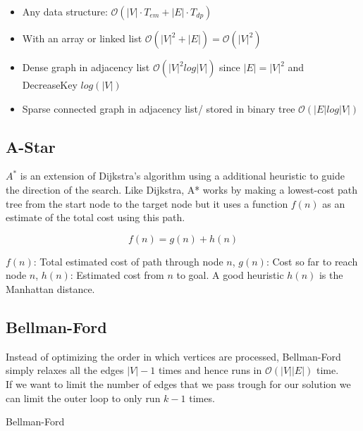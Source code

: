 \documentclass[9pt,landscape,a4paper, table]{extarticle}
\begin{document}
\begin{multicols*}{3}
\begin{itemize}
    \item Any data structure: $\mathcal{O}(|V|\cdot T_{em} + |E| \cdot T_{dp})$
    \item With an array or linked list $\mathcal{O}(|V|^2 + |E|) = \mathcal{O}(|V|^2) $
    \item Dense graph in adjacency list $\mathcal{O}(|V|^2 log |V|) $ since $|E| = |V|^2$ and DecreaseKey $log(|V|)$
    \item Sparse connected graph in adjacency list/ stored in binary tree $\mathcal{O}(|E|  log |V|) $
\end{itemize}

\subsection{A-Star}

$A^*$ is an extension of Dijkstra's algorithm using a additional heuristic to guide the direction of the search. Like Dijkstra, A* works by making a lowest-cost path tree from the start node to the target node but it uses a function $f(n)$ as an estimate of the total cost using this path. 

$$f(n) = g(n) + h(n)$$

$f(n)$: Total estimated cost of path through node $n$, $g(n)$: Cost so far to reach node $n$, $h(n)$: Estimated cost from $n$ to goal. A good heuristic $h(n)$ is the Manhattan distance. 

\subsection{Bellman-Ford}

Instead of optimizing the order in which vertices are processed, Bellman-Ford simply relaxes all the edges $|V| - 1$ times and hence runs in $\mathcal{O}(|V| |E|)$ time.\\
If we want to limit the number of edges that we pass trough for our solution we can limit the outer loop to only run $k - 1$ times.

{\scriptsize
\begin{algorithm}[H]
    \caption{Bellman-Ford}
    \label{FWAlgorithm}
    \SetAlgoLined
    
\end{algorithm}}
\end{multicols*}
\end{document}
